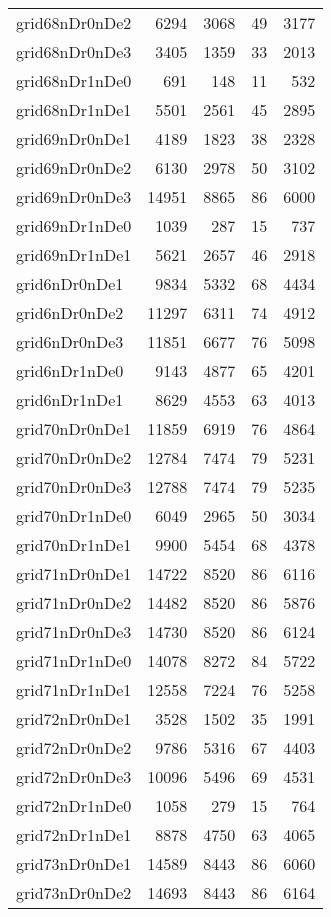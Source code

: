 \begin{longtable}{lrrrr}
grid68nDr0nDe2 & 6294 & 3068 & 49 & 3177 \\
grid68nDr0nDe3 & 3405 & 1359 & 33 & 2013 \\
grid68nDr1nDe0 & 691 & 148 & 11 & 532 \\
grid68nDr1nDe1 & 5501 & 2561 & 45 & 2895 \\
grid69nDr0nDe1 & 4189 & 1823 & 38 & 2328 \\
grid69nDr0nDe2 & 6130 & 2978 & 50 & 3102 \\
grid69nDr0nDe3 & 14951 & 8865 & 86 & 6000 \\
grid69nDr1nDe0 & 1039 & 287 & 15 & 737 \\
grid69nDr1nDe1 & 5621 & 2657 & 46 & 2918 \\
grid6nDr0nDe1 & 9834 & 5332 & 68 & 4434 \\
grid6nDr0nDe2 & 11297 & 6311 & 74 & 4912 \\
grid6nDr0nDe3 & 11851 & 6677 & 76 & 5098 \\
grid6nDr1nDe0 & 9143 & 4877 & 65 & 4201 \\
grid6nDr1nDe1 & 8629 & 4553 & 63 & 4013 \\
grid70nDr0nDe1 & 11859 & 6919 & 76 & 4864 \\
grid70nDr0nDe2 & 12784 & 7474 & 79 & 5231 \\
grid70nDr0nDe3 & 12788 & 7474 & 79 & 5235 \\
grid70nDr1nDe0 & 6049 & 2965 & 50 & 3034 \\
grid70nDr1nDe1 & 9900 & 5454 & 68 & 4378 \\
grid71nDr0nDe1 & 14722 & 8520 & 86 & 6116 \\
grid71nDr0nDe2 & 14482 & 8520 & 86 & 5876 \\
grid71nDr0nDe3 & 14730 & 8520 & 86 & 6124 \\
grid71nDr1nDe0 & 14078 & 8272 & 84 & 5722 \\
grid71nDr1nDe1 & 12558 & 7224 & 76 & 5258 \\
grid72nDr0nDe1 & 3528 & 1502 & 35 & 1991 \\
grid72nDr0nDe2 & 9786 & 5316 & 67 & 4403 \\
grid72nDr0nDe3 & 10096 & 5496 & 69 & 4531 \\
grid72nDr1nDe0 & 1058 & 279 & 15 & 764 \\
grid72nDr1nDe1 & 8878 & 4750 & 63 & 4065 \\
grid73nDr0nDe1 & 14589 & 8443 & 86 & 6060 \\
grid73nDr0nDe2 & 14693 & 8443 & 86 & 6164 \\

\end{longtable}
